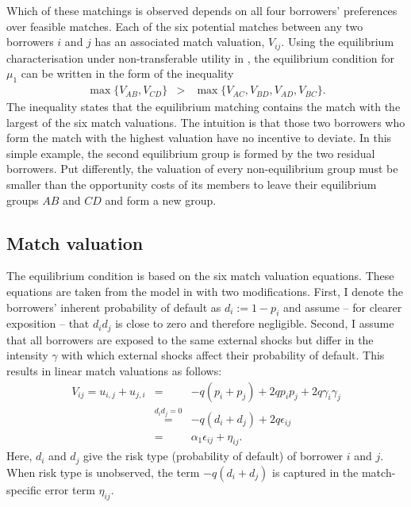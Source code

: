 Which of these matchings is observed depends on all four borrowers' preferences over feasible matches. Each of the six potential matches between any two borrowers $i$ and $j$ has an associated match valuation, $V_{ij}$. %
Using the equilibrium characterisation under non-transferable utility in \citet{Klein2015a}, the equilibrium condition for $\mu_1$ can be written in the form of the inequality
\begin{eqnarray} \label{Eqn:IntroExampleEquilibriumCondition}
\max\{ V_{AB}, V_{CD} \} &>& \max\{ V_{AC}, V_{BD}, V_{AD}, V_{BC} \}.
\end{eqnarray} 
The inequality states that the equilibrium matching contains the match with the largest of the six match valuations. The intuition is that those two borrowers who form the match with the highest valuation have no incentive to deviate. In this simple example, the second equilibrium group is formed by the two residual borrowers. Put differently, the valuation of every non-equilibrium group must be smaller than the opportunity costs of its members to leave their equilibrium groups $AB$ and $CD$ and form a new group.



\subsection{Match valuation}

The equilibrium condition is based on the six match valuation equations. These equations are taken from the model in \citet{Ghatak1999} with %
two modifications. First, I denote the borrowers' inherent probability of default as $d_i:=1-p_i$ and assume -- for clearer exposition -- that $d_id_j$ is close to zero and therefore negligible. Second, I assume that all borrowers are exposed to the same external shocks but differ in the intensity $\gamma$ with which external shocks affect their probability of default. 
This results in linear match valuations as follows:
\begin{eqnarray}
V_{ij} = u_{i,j} + u_{j,i} &=& -q(p_i+p_j) + 2qp_ip_j + 2q\gamma_i\gamma_j \\
       &\stackrel{d_id_j=0}{=}& -q(d_i+d_j) + 2q\epsilon_{ij} \label{Eqn:ExampleSelectionEqn2}\\ 
       &=& \alpha_1 \epsilon_{ij} + \eta_{ij}. \label{Eqn:ExampleSelectionEqn}
\end{eqnarray}
Here, $d_i$ and $d_j$ give the risk type (probability of default) of borrower $i$ and $j$. 
When risk type is unobserved, the term $-q(d_i+d_j)$ is captured in the match-specific error term $\eta_{ij}$. 

